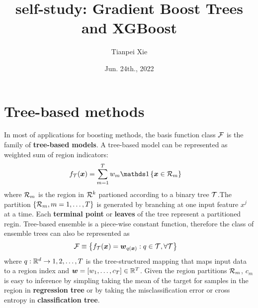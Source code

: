 \documentclass[11pt]{article}
\begin{document}
\title{self-study: Gradient Boost Trees and XGBoost}
\author{ Tianpei Xie}
\date{ Jun. 24th., 2022 }
\maketitle
\tableofcontents
\newpage
\allowdisplaybreaks
\section{Tree-based methods}
In most of applications for boosting methods, the basis function class ${\mathcal F}$ is the family of \textbf{tree-based models}.  A tree-based model can be represented as weighted sum of region indicators: 
\begin{align*}
f_{\cT}(\mb{x}) &= \sum_{m=1}^{T}w_{m}\ind{\mb{x} \in \cR_{m}}
\end{align*} where ${\mathcal R}_{m}$ is the region in ${\mathcal R}^{k}$ partioned according to a binary tree ${\mathcal T}$.The partition $\left\{{\mathcal R}_{m}, m=1,\dots,T\right\}$ is generated by branching at one input feature $x^{j}$ at a time. Each \textbf{terminal point} or \textbf{leaves} of the tree represent a partitioned regin.  Tree-based ensemble is a piece-wise constant function,  therefore the class of ensemble trees can also be represented as
\begin{align*}
{\mathcal F} &\equiv \left\{ f_{ {\mathcal T}}(\boldsymbol{x}) = \boldsymbol{w}_{q(\boldsymbol{x})}: q \in {\mathcal T}, \forall  {\mathcal T}  \right\}
\end{align*} where $q: {\mathbb R}^{d} \rightarrow {1,2,\dots,T}$ is the tree-structured mapping that maps input data to a region index and $\boldsymbol{w} = \left[w_{1}, \dots, c_{T}\right] \in {\mathbb R}^{T}$. Given the region partitions ${\mathcal R}_{m}$,  $c_{m}$ is easy to inference by simpling taking the mean of the target for samples in the region in \textbf{regression tree} or by taking the misclassification error or cross entropy in \textbf{classification tree}.
\end{document}
